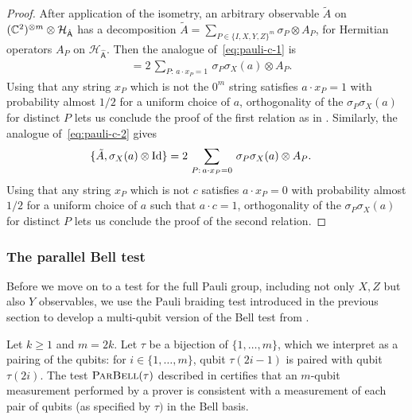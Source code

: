 \documentclass{toc}
\newcommand{\Id}{\ensuremath{\mathop{\rm Id}\nolimits}}
\newcommand{\reg}[1]{{\textsf{#1}}}
\newcommand{\mH}{\mathcal{H}}
\newcommand{\pbellt}{\textsc{ParBell}}
\begin{document}
\begin{proof}
After application of the isometry, an arbitrary observable $\tilde{A}$ on  $(\C^2)^{\otimes m} \otimes \mH_{\hat{\reg{A}}}$ has a decomposition $\tilde{A} = \sum_{P\in\{I,X,Y,Z\}^m} \sigma_P \otimes A_P$, for Hermitian operators $A_P$ on $\mH_{\hat{\reg{A}}}$. 
 Then the analogue of~\eqref{eq:pauli-c-1} is
\begin{align*}
[\tilde{A},\sigma_X(a)\otimes \Id] &= 2 \,\sum_{P:\,a\cdot x_P=1} \,\sigma_P\sigma_X(a) \otimes A_P.
\end{align*} 
Using that any string $x_P$ which is not the $0^m$ string satisfies $a\cdot x_P = 1$ with probability almost $1/2$ for a uniform choice of $a$, orthogonality of the $\sigma_P\sigma_X(a) $ for distinct $P$ lets us conclude the proof of the first relation as in . Similarly, the analogue of~\eqref{eq:pauli-c-2} gives
\begin{align*}
\{\tilde{A},\sigma_X(a)\otimes \Id\} &= 2 \,\sum_{P:\,a\cdot x_P=0} \,\sigma_P\sigma_X(a) \otimes A_P.
\end{align*} 
Using that any string $x_P$ which is not $c$ satisfies $a\cdot x_P = 0$ with probability almost $1/2$ for a uniform choice of $a$ such that $a\cdot c=1$, orthogonality of the $\sigma_P\sigma_X(a) $ for distinct $P$ lets us conclude the proof of the second relation.
\end{proof}


\subsubsection{The parallel Bell test}
\label{sec:perm}


Before we move on to a test for the full Pauli group, including not only $X,Z$ but also $Y$ observables, we use the Pauli braiding test introduced in the previous section to develop a multi-qubit version of the Bell test from .

Let $k\geq 1$ and $m=2k$. Let $\tau$ be a bijection of $\{1,\ldots,m\}$, which we interpret as a pairing of the qubits: for $i\in\{1,\ldots,m\}$, qubit $\tau(2i-1)$ is paired with qubit $\tau(2i)$. 
The test $\pbellt(\tau)$ described in  certifies that an $m$-qubit measurement performed by a prover is consistent with a measurement of each pair of qubits (as specified by $\tau)$ in the Bell basis. 
\end{document}
